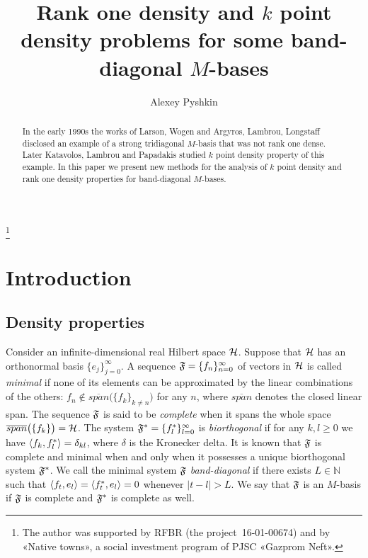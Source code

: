 \documentclass[12pt]{amsart}
\theoremstyle{case}
\begin{document}
\title{Rank one density and $k$ point density problems for some band-diagonal $M$-bases}
\author{Alexey Pyshkin}
\begin{abstract}
  In the early 1990s the works of Larson, Wogen and Argyros, Lambrou, Longstaff
    disclosed an example of a strong tridiagonal $M$-basis that was not rank one dense.
  Later Katavolos, Lambrou and Papadakis studied $k$ point density property of this example.
  In this paper we present new methods for the analysis of $k$ point density
    and rank one density properties for band-diagonal $M$-bases.
\end{abstract}
\thanks{The author was supported by RFBR (the project~16-01-00674) and by «Native towns», a social investment program of PJSC «Gazprom Neft».}
\maketitle

\section{Introduction}
  \subsection{Density properties}
    Consider an infinite-dimensional real Hilbert space $\cal{H}$.
    Suppose that $\cal{H}$ has an orthonormal basis $\{e_j\}_{j=0}^\infty$.
    A sequence $\fsys=\seq{f}$ of vectors in $\cal{H}$ is called \emph{minimal} if none of its elements can be approximated by the linear combinations of the others: $f_n \notin
      \overline{span}\big(\{f_k\}_{k \ne n}\big)$ for any $n$, where $\overline{span}$ denotes the closed linear span.
    The sequence $\fsys$ is said to be \emph{complete} when it spans the whole space $\overline{span}\big(\{f_k\}\big)=\cal{H}$.
    The system $\fstarsys = \{f_l^*\}_{l=0}^\infty$ is \emph{biorthogonal} if for any $k,l \geq 0$ we have $\inner{f_k}{f^*_l} = \delta_{kl}$, where $\delta$ is the Kronecker delta.
    It is known that $\fsys$ is complete and minimal when and only when it possesses a unique biorthogonal system $\fstarsys$.
    We call the minimal system $\fsys$ \emph{band-diagonal} if there exists $L \in \mathbb{N}$ such that $\inner{f_t}{e_l} = \inner{f^*_t}{e_l} = 0$
      whenever $\lvert t - l \rvert > L$.
    We say that $\fsys$ is an $M$-basis if $\fsys$ is complete and $\fstarsys$ is complete as well.
\end{document}
